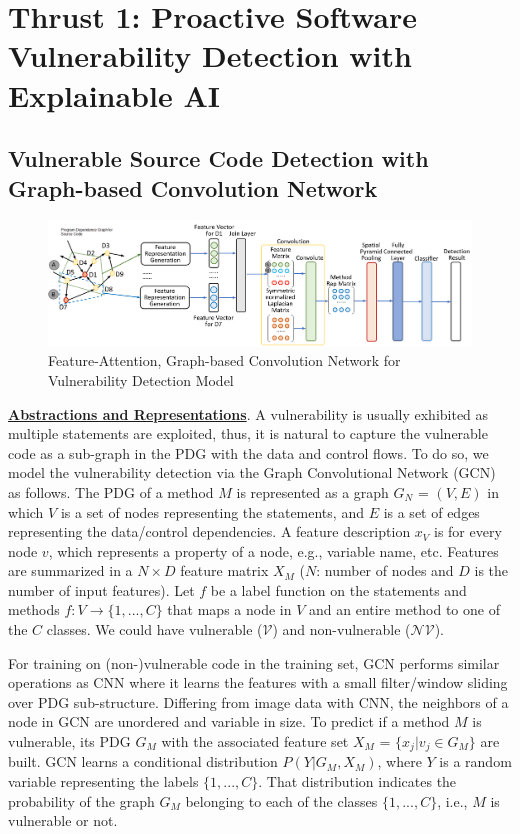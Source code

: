 \section{Thrust 1: Proactive Software Vulnerability Detection with Explainable AI}
\label{sec:thrust1}

\subsection{Vulnerable Source Code Detection with Graph-based Convolution Network} \label{sec:vd}

\begin{figure}[!hbt]
    \centering
    \includegraphics[width=6.5in]{graph-based-CNN.png}
    \caption{Feature-Attention, Graph-based Convolution Network for
      Vulnerability Detection Model}
    \label{fig:detection-model}
\end{figure}


\noindent \underline{\bf Abstractions and Representations}. A vulnerability is usually
exhibited as multiple statements are exploited, thus, it is natural to
capture the vulnerable code as a sub-graph in the PDG with the data
and control flows. To do so, we model the vulnerability
detection via the Graph Convolutional Network (GCN)~\cite{GCN16} as
follows. The PDG of a method $M$ is represented as a graph $G_N$ =
$(V,E)$ in which $V$ is a set of nodes representing the statements,
and $E$ is a set of edges representing the data/control dependencies.
%
A feature description $x_V$ is for every node $v$, which represents a
property of a node, e.g., variable name, etc. Features are summarized
in a $N \times D$ feature matrix $X_M$ ($N$: number of nodes and $D$
is the number of input features).
%
Let $f$ be a label function on the statements and methods $f: V
\rightarrow \{1,...,C\}$ that maps a node in $V$ and an entire method
to one of the $C$ classes. We could have vulnerable
($\mathcal{V}$) and non-vulnerable ($\mathcal{NV}$).


For training on (non-)vulnerable code in the training set, GCN
performs similar operations as CNN where it learns the features with a
small filter/window sliding over PDG sub-structure. Differing from
image data with CNN, the neighbors of a node in GCN are unordered and
variable in size. To predict if a method $M$ is vulnerable, its PDG
$G_M$ with the associated feature set $X_M$ = $\{x_j|v_j \in G_M\}$
are built. GCN learns a conditional distribution $P(Y|G_M,X_M)$, where
$Y$ is a random variable representing the labels $\{1,...,C\}$. That
distribution indicates the probability of the graph $G_M$ belonging to
each of the classes $\{1,...,C\}$, i.e., $M$ is vulnerable or not.

